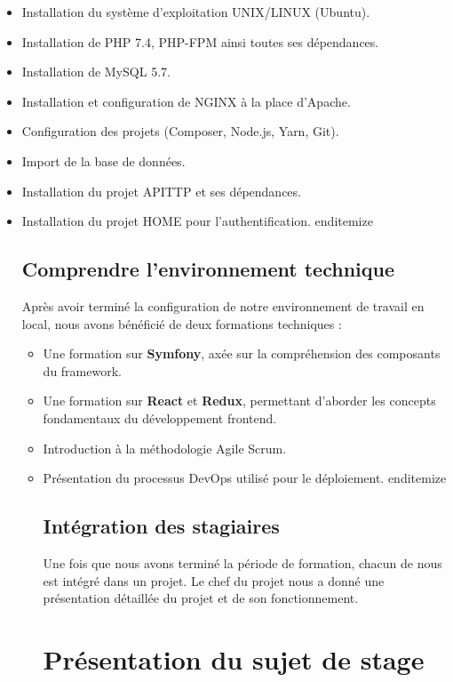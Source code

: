 \begin{itemize}
\begin{itemize}
\begin{itemize}
\begin{itemize}
    \item Installation du système d'exploitation UNIX/LINUX (Ubuntu).
    \item Installation de PHP 7.4, PHP-FPM ainsi toutes ses dépendances.
    \item Installation de MySQL 5.7.
    \item Installation et configuration de NGINX à la place d'Apache.
    \item Configuration des projets (Composer, Node.js, Yarn, Git).
    \item Import de la base de données.
    \item Installation du projet APITTP et ses dépendances.
    \item Installation du projet HOME pour l'authentification.
end{itemize}

\subsection{Comprendre l'environnement technique}

Après avoir terminé la configuration de notre environnement de travail en local, nous avons bénéficié de deux formations techniques :

\begin{itemize}
    \item Une formation sur \textbf{Symfony}, axée sur la compréhension des composants du framework.
    \item Une formation sur \textbf{React} et \textbf{Redux}, permettant d'aborder les concepts fondamentaux du développement frontend.
    \item Introduction à la méthodologie Agile Scrum.
    \item Présentation du processus DevOps utilisé pour le déploiement.
end{itemize}

\subsection{Intégration des stagiaires}

Une fois que nous avons terminé la période de formation, chacun de nous est intégré dans un projet. Le chef du projet nous a donné une présentation détaillée du projet et de son fonctionnement.

\section{Présentation du sujet de stage}


\end{itemize}
\end{itemize}
\end{itemize}
\end{itemize}
\end{itemize}
